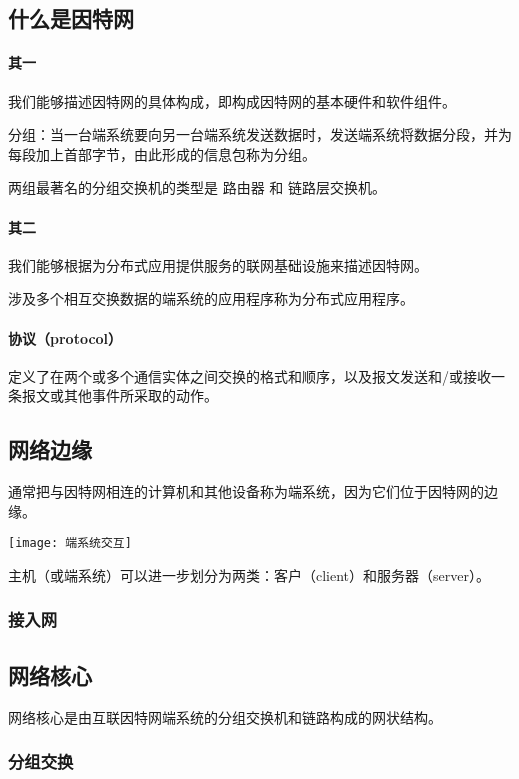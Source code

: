 \subsection{什么是因特网}

\paragraph*{其一}我们能够描述因特网的具体构成，即构成因特网的基本硬件和软件组件。

分组：当一台端系统要向另一台端系统发送数据时，发送端系统将数据分段，并为每段加上首部字节，由此形成的信息包称为分组。

两组最著名的分组交换机的类型是 路由器 和 链路层交换机。

\paragraph*{其二}我们能够根据为分布式应用提供服务的联网基础设施来描述因特网。

涉及多个相互交换数据的端系统的应用程序称为分布式应用程序。

\paragraph*{协议（protocol）}定义了在两个或多个通信实体之间交换的格式和顺序，以及报文发送和/或接收一条报文或其他事件所采取的动作。

\subsection{网络边缘}

通常把与因特网相连的计算机和其他设备称为端系统，因为它们位于因特网的边缘。

\texttt{[image: 端系统交互]}

主机（或端系统）可以进一步划分为两类：客户（client）和服务器（server）。

\subsubsection{接入网}

\subsection{网络核心}

网络核心是由互联因特网端系统的分组交换机和链路构成的网状结构。

\subsubsection{分组交换}

